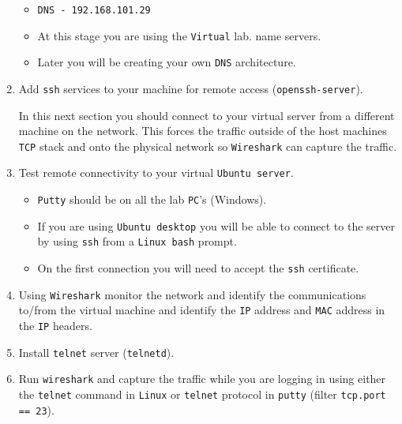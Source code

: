 \documentclass[11pt]{article}
\begin{document}
\begin{enumerate}
\begin{itemize}
            \item \texttt{DNS - 192.168.101.29}
        \end{itemize}
        \begin{tcolorbox}[title={\textbf{Notes:}}]
            \begin{itemize}
                \item At this stage you are using the \texttt{Virtual} lab. name servers.
                \item Later you will be creating your own \texttt{DNS} architecture.
            \end{itemize}
        \end{tcolorbox}
    \item Add \texttt{ssh} services to your machine for remote access (\texttt{openssh-server}).
        \begin{tcolorbox}[colback=blue!20]
            In this next section you should connect to your virtual server from a different machine on the network. This forces the traffic outside of the host machines \texttt{TCP} stack and onto the physical network so \texttt{Wireshark} can capture the traffic.
        \end{tcolorbox}
    \item Test remote connectivity to your virtual \texttt{Ubuntu server}.
        \begin{tcolorbox}[title={\textbf{Notes:}}]
            \begin{itemize}
                \item \texttt{Putty} should be on all the lab \texttt{PC}'s (Windows).
                \item If you are using \texttt{Ubuntu desktop} you will be able to connect to the server by using \texttt{ssh} from a \texttt{Linux bash} prompt.
                \item On the first connection you will need to accept the \texttt{ssh} certificate.
            \end{itemize}
        \end{tcolorbox}
    \item Using \texttt{Wireshark} monitor the network and identify the communications to/from the virtual machine and identify the \texttt{IP} address and \texttt{MAC} address in the \texttt{IP} headers.
    \item Install \texttt{telnet} server (\texttt{telnetd}).
    \item Run \texttt{wireshark} and capture the traffic while you are logging in using either the \texttt{telnet} command in \texttt{Linux} or \texttt{telnet} protocol in \texttt{putty} (filter \texttt{tcp.port == 23}).

\end{enumerate}
\end{document}
